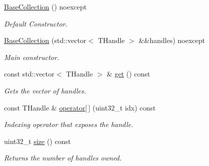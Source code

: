 \begin{DoxyCompactItemize}
\item 
\mbox{\label{structblaze_1_1vkw_1_1base_1_1BaseCollection_ab41cf18a4e885e7c6791092ff8a1226a}} 
\hyperlink{structblaze_1_1vkw_1_1base_1_1BaseCollection_ab41cf18a4e885e7c6791092ff8a1226a}{Base\+Collection} () noexcept
\begin{DoxyCompactList}\small\item\em Default Constructor. \end{DoxyCompactList}\item 
\hyperlink{structblaze_1_1vkw_1_1base_1_1BaseCollection_a615d6c0aa6602f2f5678fed9e6ad1559}{Base\+Collection} (std\+::vector$<$ T\+Handle $>$ \&\&handles) noexcept
\begin{DoxyCompactList}\small\item\em Main constructor. \end{DoxyCompactList}\item 
\mbox{\label{structblaze_1_1vkw_1_1base_1_1BaseCollection_a576b6d6312816939600f11480c1c0e63}} 
const std\+::vector$<$ T\+Handle $>$ \& \hyperlink{structblaze_1_1vkw_1_1base_1_1BaseCollection_a576b6d6312816939600f11480c1c0e63}{get} () const
\begin{DoxyCompactList}\small\item\em Gets the vector of handles. \end{DoxyCompactList}\item 
\mbox{\label{structblaze_1_1vkw_1_1base_1_1BaseCollection_a733d88e7838b830b7f80252698f9fe5e}} 
const T\+Handle \& \hyperlink{structblaze_1_1vkw_1_1base_1_1BaseCollection_a733d88e7838b830b7f80252698f9fe5e}{operator\mbox{[}$\,$\mbox{]}} (uint32\+\_\+t idx) const
\begin{DoxyCompactList}\small\item\em Indexing operator that exposes the handle. \end{DoxyCompactList}\item 
\mbox{\label{structblaze_1_1vkw_1_1base_1_1BaseCollection_a850c9787154a4915fdad3714d6567838}} 
uint32\+\_\+t \hyperlink{structblaze_1_1vkw_1_1base_1_1BaseCollection_a850c9787154a4915fdad3714d6567838}{size} () const
\begin{DoxyCompactList}\small\item\em Returns the number of handles owned. \end{DoxyCompactList}\item 

\end{DoxyCompactItemize}
